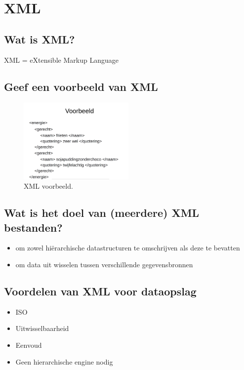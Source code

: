 \section{XML}

\subsection{Wat is XML?}

XML = eXtensible Markup Language

\subsection{Geef een voorbeeld van XML}

\begin{figure}[h!]
\centering
  \includegraphics[width=0.5\textwidth]{./figures/xml.png}
  \caption{XML voorbeeld.}
  \label{fig:xml}
\end{figure}


\subsection{Wat is het doel van (meerdere) XML bestanden?}

\begin{itemize}
    \item om zowel hiërarchische datastructuren te omschrijven als deze te bevatten
    \item om data uit wisselen tussen verschillende gegevensbronnen
\end{itemize}

\subsection{Voordelen van XML voor dataopslag}

\begin{itemize}
\item ISO
\item Uitwisselbaarheid
\item Eenvoud
\item Geen hierarchische engine nodig
\end{itemize}

